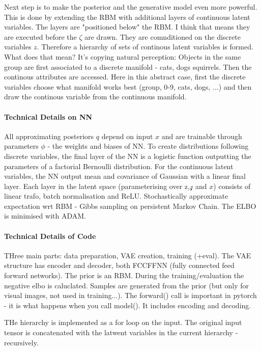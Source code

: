 Next step is to make the posterior and the generative model even more powerful.
This is done by extending the RBM with additional layers of continuous latent
variables. The layers are "positioned below" the RBM. I think that means they
are executed before the $\zeta$ are drawn. They are comnditioned on the discrete
variables $z$. Therefore a hierarchy of sets of continous latent variables is
formed. What does that mean? It's copying natural perception: Objects in the
same group are first associated to a discrete manifold - cats, dogs squirrels.
Then the continous attributes are accessed. Here in this abstract case, first
the discrete variables choose what manifold works best (group, 0-9, cats, dogs,
...) and then draw the continous variable from the continuous manifold. 

\paragraph{Technical Details on NN}
All approximating posteriors $q$ depend on input $x$ and are trainable through
parameters $\phi$ - the weights and biases of NN. To create distributions
following discrete variables, the final layer of the NN is a logistic function
outputting the parameters of a factorial Bernoulli distribution. For the
continuous latent variables, the NN output mean and covariance of Gaussian with
a linear final layer. Each layer in the latent space (parameterising over
z,$\mathcal{z}$ and $x$) consists of linear trafo, batch normalisation and ReLU.
Stochastically approximate expectation wrt RBM - Gibbs sampling on persistent
Markov Chain. The ELBO is minimised with ADAM.

\paragraph{Technical Details of Code} THree main parts: data preparation, VAE
creation, training (+eval). The VAE structure has encoder and decoder, both
FCCFFNN (fully connected feed forward networks). The prior is an RBM. During the
training/evaluation  the negative elbo is caluclated. Samples are generated from
the prior (but only for visual images, not used in training...). The forward()
call is important in pytorch - it is what happens when you call model(). It
includes encoding and decoding. 

THe hierarchy is implemented as a for loop on the input. The original input
tensor is concatenated with the latwent variables in the current hierarchy -
recursively. 

